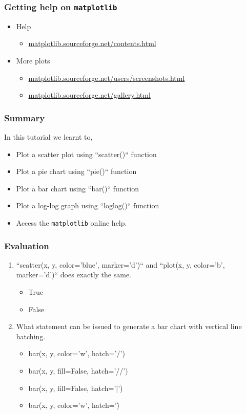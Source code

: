 \documentclass[presentation]{beamer}
\begin{document}
\begin{frame}
\frametitle{Getting help on \verb~matplotlib~}
\label{sec-19}


\begin{itemize}
\item Help
\begin{itemize}
\item \hyperref[matplotlib.sourceforge.net--contents.html]{matplotlib.sourceforge.net/contents.html}
\end{itemize}
\item More plots
\begin{itemize}
\item \hyperref[matplotlib.sourceforge.net--users--screenshots.html]{matplotlib.sourceforge.net/users/screenshots.html}
\item \hyperref[matplotlib.sourceforge.net--gallery.html]{matplotlib.sourceforge.net/gallery.html}
\end{itemize}
\end{itemize}
\end{frame}
\begin{frame}
\frametitle{Summary}
\label{sec-20}

  In this tutorial we learnt to,
 

\begin{itemize}
\item Plot a scatter plot using ``scatter()`` function
\item Plot a pie chart using ``pie()`` function
\item Plot a bar chart using ``bar()`` function
\item Plot a log-log graph using ``loglog()`` function
\item Access the \verb~matplotlib~ online help.
\end{itemize}
\end{frame}
\begin{frame}
\frametitle{Evaluation}
\label{sec-21}


\begin{enumerate}
\item ``scatter(x, y, color='blue', marker='d')`` and ``plot(x, y,
     color='b', marker='d')`` does exactly the same.
\begin{itemize}
\item True
\item False
\end{itemize}
\item What statement can be issued to generate a bar chart with vertical
     line hatching.
\begin{itemize}
\item bar(x, y, color='w', hatch='/')
\item bar(x, y, fill=False, hatch='//')
\item bar(x, y, fill=False, hatch='|')
\item bar(x, y, color='w', hatch='\')
\end{itemize}
\end{enumerate}
\end{frame}
\end{document}
